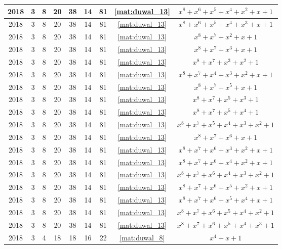 \begin{longtable}{|c|c|c|c|c|c|c|c|c|}
2018 & 3 & 8 & 20 & 38 & 14 & 81 & \eqref{mat:duwal_13} & $x^8 + x^6 + x^5 + x^4 + x^2 + x + 1$ \\ \hline 
2018 & 3 & 8 & 20 & 38 & 14 & 81 & \eqref{mat:duwal_13} & $x^8 + x^6 + x^5 + x^4 + x^3 + x + 1$ \\ \hline 
2018 & 3 & 8 & 20 & 38 & 14 & 81 & \eqref{mat:duwal_13} & $x^8 + x^7 + x^2 + x + 1$ \\ \hline 
2018 & 3 & 8 & 20 & 38 & 14 & 81 & \eqref{mat:duwal_13} & $x^8 + x^7 + x^3 + x + 1$ \\ \hline 
2018 & 3 & 8 & 20 & 38 & 14 & 81 & \eqref{mat:duwal_13} & $x^8 + x^7 + x^3 + x^2 + 1$ \\ \hline 
2018 & 3 & 8 & 20 & 38 & 14 & 81 & \eqref{mat:duwal_13} & $x^8 + x^7 + x^4 + x^3 + x^2 + x + 1$ \\ \hline 
2018 & 3 & 8 & 20 & 38 & 14 & 81 & \eqref{mat:duwal_13} & $x^8 + x^7 + x^5 + x + 1$ \\ \hline 
2018 & 3 & 8 & 20 & 38 & 14 & 81 & \eqref{mat:duwal_13} & $x^8 + x^7 + x^5 + x^3 + 1$ \\ \hline 
2018 & 3 & 8 & 20 & 38 & 14 & 81 & \eqref{mat:duwal_13} & $x^8 + x^7 + x^5 + x^4 + 1$ \\ \hline 
2018 & 3 & 8 & 20 & 38 & 14 & 81 & \eqref{mat:duwal_13} & $x^8 + x^7 + x^5 + x^4 + x^3 + x^2 + 1$ \\ \hline 
2018 & 3 & 8 & 20 & 38 & 14 & 81 & \eqref{mat:duwal_13} & $x^8 + x^7 + x^6 + x + 1$ \\ \hline 
2018 & 3 & 8 & 20 & 38 & 14 & 81 & \eqref{mat:duwal_13} & $x^8 + x^7 + x^6 + x^3 + x^2 + x + 1$ \\ \hline 
2018 & 3 & 8 & 20 & 38 & 14 & 81 & \eqref{mat:duwal_13} & $x^8 + x^7 + x^6 + x^4 + x^2 + x + 1$ \\ \hline 
2018 & 3 & 8 & 20 & 38 & 14 & 81 & \eqref{mat:duwal_13} & $x^8 + x^7 + x^6 + x^4 + x^3 + x^2 + 1$ \\ \hline 
2018 & 3 & 8 & 20 & 38 & 14 & 81 & \eqref{mat:duwal_13} & $x^8 + x^7 + x^6 + x^5 + x^2 + x + 1$ \\ \hline 
2018 & 3 & 8 & 20 & 38 & 14 & 81 & \eqref{mat:duwal_13} & $x^8 + x^7 + x^6 + x^5 + x^4 + x + 1$ \\ \hline 
2018 & 3 & 8 & 20 & 38 & 14 & 81 & \eqref{mat:duwal_13} & $x^8 + x^7 + x^6 + x^5 + x^4 + x^2 + 1$ \\ \hline 
2018 & 3 & 8 & 20 & 38 & 14 & 81 & \eqref{mat:duwal_13} & $x^8 + x^7 + x^6 + x^5 + x^4 + x^3 + 1$ \\ \hline 
2018 & 3 & 4 & 18 & 18 & 16 & 22 & \eqref{mat:duwal_8} & $x^4 + x + 1$ \\ \hline 

\end{longtable}
